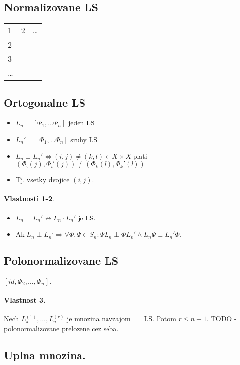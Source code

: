\documentclass[10pt,a4paper]{article}
\begin{document}
\subsection{Normalizovane LS}
\begin{tabular}{l c r}
1 & 2 & \ldots \\
2 & & \\
3 & & \\
\ldots & & \\
\end{tabular}

\subsection{Ortogonalne LS}
\begin{itemize}
\item $L_n = [\Phi_1, \ldots \Phi_n]$ jeden LS
\item $L_n' = [\Phi_1, \ldots \Phi_n]$ sruhy LS
\item $L_n \perp L_n' \Leftrightarrow (i,j) \neq (k,l) \in X \times X$ plati $(\Phi_i(j), \Phi_i'(j)) \neq (\Phi_k(l), \Phi_k'(l))$
\item Tj. vsetky dvojice $(i,j)$. 
\end{itemize}

\paragraph{Vlastnosti 1-2.}
\begin{itemize}
\item $L_n \perp L_n' \Leftrightarrow L_n \cdot L_n'$ je LS.
\item Ak $L_n \perp L_n' \Rightarrow \forall \Phi, \Psi \in S_n: \Psi L_n \perp \Phi L_n' \wedge L_n \Psi \perp L_n' \Phi$.
\end{itemize}

\subsection{Polonormalizovane LS}
$[id, \Phi_2, \ldots, \Phi_n]$. 
\paragraph{Vlastnost 3.}
Nech $L_n^{(1)}, \ldots ,L_n^{(r)}$ je mnozina navzajom $\perp$ LS. Potom $r \leq n-1$. 
TODO - polonormalizovane prelozene cez seba. 

\subsection{Uplna mnozina.}
\end{document}
